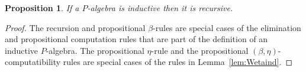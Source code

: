 \documentclass[10pt,a4paper,oneside,reqno]{amsart}
\numberwithin{equation}{section}
\theoremstyle{mythm}
\newtheorem{proposition}[theorem]{Proposition}
\theoremstyle{mydef}
\theoremstyle{myrmk}
\newcommand{\lam}[1]{\lambda_{#1}}
\newcommand{\W}{\mathsf{W}}
\newcommand{\wsup}{\mathsf{sup}}
\newcommand{\wrec}{\mathsf{wrec}}
\newcommand{\UU}{\mathsf{U}}
\begin{document}
\begin{proposition} \label{thm:Windrec}
If a $P$-algebra is inductive then it is recursive.
\end{proposition}


\begin{proof} The recursion and propositional $\beta$-rules are special cases of the elimination and propositional computation rules that are part of the definition of an inductive $P$-algebra. The propositional $\eta$-rule and the
propositional $(\beta, \eta)$-computatibility rules are special cases of the rules in Lemma~\ref{lem:Wetaind}. 
\end{proof}



%
%
\end{document}
